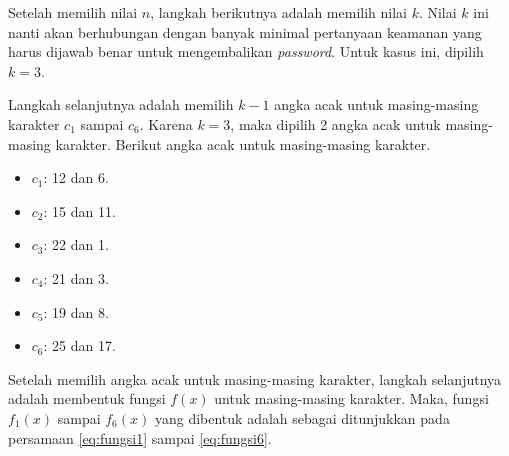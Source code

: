 Setelah memilih nilai \begin{math}n\end{math}, langkah berikutnya adalah memilih nilai \begin{math}k\end{math}. Nilai \begin{math}k\end{math} ini nanti akan berhubungan dengan banyak minimal pertanyaan keamanan yang harus dijawab benar untuk mengembalikan \textit{password}. Untuk kasus ini, dipilih \begin{math}k=3\end{math}.

Langkah selanjutnya adalah memilih \begin{math}k-1\end{math} angka acak untuk masing-masing karakter \begin{math}c_1\end{math} sampai \begin{math}c_6\end{math}. Karena \begin{math}k=3\end{math}, maka dipilih 2 angka acak untuk masing-masing karakter. Berikut angka acak untuk masing-masing karakter.

\begin{itemize}[itemsep=0mm]
	\item \begin{math}c_1\end{math}: 12 dan 6.
	\item \begin{math}c_2\end{math}: 15 dan 11.
	\item \begin{math}c_3\end{math}: 22 dan 1.
	\item \begin{math}c_4\end{math}: 21 dan 3.
	\item \begin{math}c_5\end{math}: 19 dan 8.
	\item \begin{math}c_6\end{math}: 25 dan 17.
\end{itemize}

Setelah memilih angka acak untuk masing-masing karakter, langkah selanjutnya adalah membentuk fungsi \begin{math}f(x)\end{math} untuk masing-masing karakter. Maka, fungsi \begin{math}f_1(x)\end{math} sampai \begin{math}f_6(x)\end{math} yang dibentuk adalah sebagai ditunjukkan pada persamaan \ref{eq:fungsi1} sampai \ref{eq:fungsi6}.

